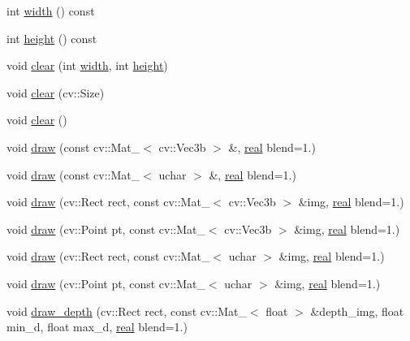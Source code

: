 \begin{DoxyCompactItemize}
\item 
int \hyperlink{classtlz_1_1viewer_acc43bf1dd1d0c3cdc35a948d4c194769}{width} () const 
\item 
int \hyperlink{classtlz_1_1viewer_af74a8aef9dde68eeff6b1e2561b39014}{height} () const 
\item 
void \hyperlink{classtlz_1_1viewer_a0ad9ee28b8127c63b2886b04fb36e3dc}{clear} (int \hyperlink{classtlz_1_1viewer_acc43bf1dd1d0c3cdc35a948d4c194769}{width}, int \hyperlink{classtlz_1_1viewer_af74a8aef9dde68eeff6b1e2561b39014}{height})
\item 
void \hyperlink{classtlz_1_1viewer_abf8fc445268cb0728c87c0962a774fb8}{clear} (cv\+::\+Size)
\item 
void \hyperlink{classtlz_1_1viewer_a2a8d3e239c7f75ea8cc0ddd953276289}{clear} ()
\item 
void \hyperlink{classtlz_1_1viewer_a5f0412cff89a343ad52431689502389d}{draw} (const cv\+::\+Mat\+\_\+$<$ cv\+::\+Vec3b $>$ \&, \hyperlink{namespacetlz_a15fd37cce97f2b8b606af18c2615f602}{real} blend=1.)
\item 
void \hyperlink{classtlz_1_1viewer_a3aac899e0fc8dcd0889d261a10690443}{draw} (const cv\+::\+Mat\+\_\+$<$ uchar $>$ \&, \hyperlink{namespacetlz_a15fd37cce97f2b8b606af18c2615f602}{real} blend=1.)
\item 
void \hyperlink{classtlz_1_1viewer_a867304c9793f767be94e5dc59f4c750e}{draw} (cv\+::\+Rect rect, const cv\+::\+Mat\+\_\+$<$ cv\+::\+Vec3b $>$ \&img, \hyperlink{namespacetlz_a15fd37cce97f2b8b606af18c2615f602}{real} blend=1.)
\item 
void \hyperlink{classtlz_1_1viewer_a3a31847220e3d5b88038d87585217fc8}{draw} (cv\+::\+Point pt, const cv\+::\+Mat\+\_\+$<$ cv\+::\+Vec3b $>$ \&img, \hyperlink{namespacetlz_a15fd37cce97f2b8b606af18c2615f602}{real} blend=1.)
\item 
void \hyperlink{classtlz_1_1viewer_ab2abefe044b4d33984b44039024f043f}{draw} (cv\+::\+Rect rect, const cv\+::\+Mat\+\_\+$<$ uchar $>$ \&img, \hyperlink{namespacetlz_a15fd37cce97f2b8b606af18c2615f602}{real} blend=1.)
\item 
void \hyperlink{classtlz_1_1viewer_a47a85ba549b86f7ec391069c0cded9c5}{draw} (cv\+::\+Point pt, const cv\+::\+Mat\+\_\+$<$ uchar $>$ \&img, \hyperlink{namespacetlz_a15fd37cce97f2b8b606af18c2615f602}{real} blend=1.)
\item 
void \hyperlink{classtlz_1_1viewer_a7f8bb5582e18ad278881cc065d7c21fa}{draw\+\_\+depth} (cv\+::\+Rect rect, const cv\+::\+Mat\+\_\+$<$ float $>$ \&depth\+\_\+img, float min\+\_\+d, float max\+\_\+d, \hyperlink{namespacetlz_a15fd37cce97f2b8b606af18c2615f602}{real} blend=1.)

\end{DoxyCompactItemize}
